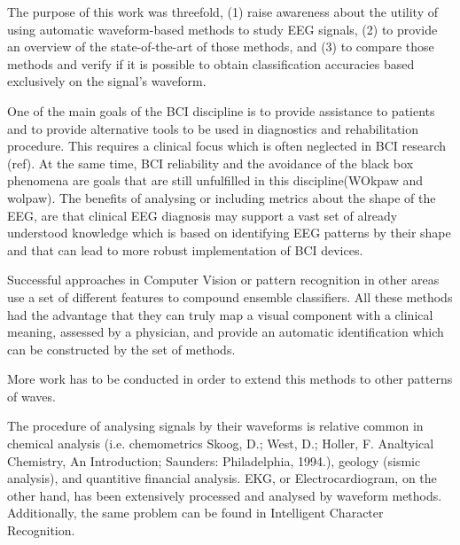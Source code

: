\documentclass[brainsci,article,submit,moreauthors,pdftex,10pt,a4paper]{mdpi}
\begin{document}
The purpose of this work was threefold, (1) raise awareness about the utility of using automatic waveform-based methods to study EEG signals, (2) to provide an overview of the state-of-the-art of those methods, and (3) to compare those methods and verify if it is possible to obtain classification accuracies based exclusively on the signal's waveform.

One of the main goals of the BCI discipline is to provide assistance to patients and to provide alternative tools to be used in diagnostics and rehabilitation procedure.  This requires a clinical focus which is often neglected in BCI research (ref).  At the same time, BCI reliability and the avoidance of the black box phenomena are goals that are still unfulfilled in this discipline(WOkpaw and wolpaw). The benefits of analysing or including metrics about the shape of the EEG, are that clinical EEG diagnosis may support a vast set of already understood knowledge which is based on identifying EEG patterns by their shape and that can lead to more robust implementation of BCI devices.

Successful approaches in Computer Vision or pattern recognition in other areas use a set of different features to compound ensemble classifiers.  All these methods had the advantage that they can truly map a visual component with a clinical meaning, assessed by a physician, and provide an automatic identification which can be constructed by the set of methods.  

More work has to be conducted in order to extend this methods to other patterns of waves.

The procedure of analysing signals by their waveforms is relative common in chemical analysis (i.e. chemometrics Skoog, D.; West, D.; Holler, F. Analtyical Chemistry, An Introduction; Saunders: Philadelphia, 1994.), geology (sismic analysis), and quantitive financial analysis.  EKG, or Electrocardiogram, on the other hand, has been extensively processed and analysed by waveform methods.
Additionally, the same problem can be found in Intelligent Character Recognition.

\end{document}
